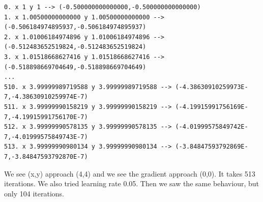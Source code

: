 \documentclass[12pt, letterpaper]{article}
\begin{document}
{\footnotesize
\begin{verbatim}
0. x 1 y 1 --> (-0.500000000000000,-0.500000000000000)
1. x 1.00500000000000 y 1.00500000000000 --> (-0.506184974895937,-0.506184974895937)
2. x 1.01006184974896 y 1.01006184974896 --> (-0.512483652519824,-0.512483652519824)
3. x 1.01518668627416 y 1.01518668627416 --> (-0.518898669704649,-0.518898669704649)
...
510. x 3.99999989719588 y 3.99999989719588 --> (-4.38630910259973E-7,-4.38630910259974E-7)
511. x 3.99999990158219 y 3.99999990158219 --> (-4.19915991756169E-7,-4.19915991756170E-7)
512. x 3.99999990578135 y 3.99999990578135 --> (-4.01999575849742E-7,-4.01999575849743E-7)
513. x 3.99999990980134 y 3.99999990980134 --> (-3.84847593792869E-7,-3.84847593792870E-7)
\end{verbatim}
}
We see (x,y) approach (4,4) and we see the gradient approach (0,0). It takes 513 iterations.
We also tried learning rate 0.05. Then we saw the same behaviour, but only 104 iterations.
\end{document}
